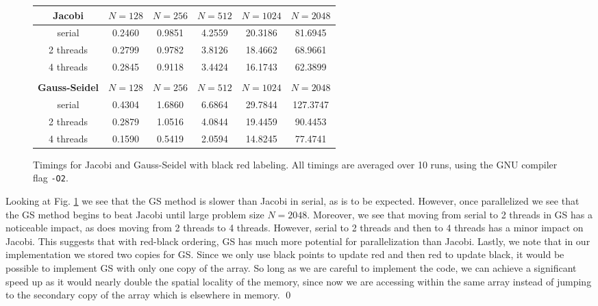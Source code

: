 \documentclass[10pt]{article}
\begin{document}
\begin{enumerate}
\begin{figure}[!ht]
\begin{center}
\begin{tabular}{| c | c | c | c | c | c |}
\hline
\textbf{Jacobi} & $N=128$ & $N=256$ & $N=512$ & $N=1024$ & $N=2048$\\
\hline 
serial & 0.2460 & 0.9851 & 4.2559 & 20.3186 & 81.6945 \\
2 threads & 0.2799 & 0.9782 & 3.8126 & 18.4662 & 68.9661\\
4 threads & 0.2845 & 0.9118 & 3.4424 & 16.1743 & 62.3899\\
\hline
& & & & & \\
\hline
\textbf{Gauss-Seidel} & $N=128$ & $N=256$ & $N=512$ & $N=1024$ & $N=2048$\\
\hline
serial & 0.4304 & 1.6860 & 6.6864 & 29.7844 & 127.3747 \\
2 threads & 0.2879 & 1.0516 & 4.0844 & 19.4459 & 90.4453 \\
4 threads & 0.1590 & 0.5419 & 2.0594 & 14.8245 & 77.4741 \\
\hline
\end{tabular}
\caption{Timings for Jacobi and Gauss-Seidel with black red labeling. All timings are averaged over 10 runs, using the GNU compiler flag \texttt{-O2}.} \label{prob4timings}
\end{center}
\end{figure}

Looking at Fig. \ref{prob4timings} we see that the GS method is slower than Jacobi in serial, as is to be expected. However, once parallelized we see that the GS method begins to beat Jacobi until large problem size $N=2048$. Moreover, we see that moving from serial to 2 threads in GS has a noticeable impact, as does moving from 2 threads to 4 threads. However, serial to 2 threads and then to 4 threads has a minor impact on Jacobi. This suggests that with red-black ordering, GS has much more potential for parallelization than Jacobi. Lastly, we note that in our implementation we stored two copies for GS. Since we only use black points to update red and then red to update black, it would be possible to implement GS with only one copy of the array. So long as we are careful to implement the code, we can achieve a significant speed up as it would nearly double the spatial locality of the memory, since now we are accessing within the same array instead of jumping to the secondary copy of the array which is elsewhere in memory. \qed 

\end{enumerate}
	







    
    
\end{document}
